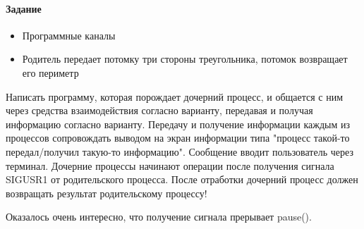 \paragraph{Задание}
\begin{itemize}
    \item Программные каналы
    \item Родитель передает потомку три стороны треугольника, потомок возвращает его периметр
\end{itemize}
Написать программу, которая порождает дочерний процесс, и общается с ним через
средства взаимодействия согласно варианту, передавая и получая информацию согласно
варианту.
Передачу и получение информации каждым из процессов сопровождать выводом на
экран информации типа "процесс такой-то передал/получил такую-то информацию".
Сообщение вводит пользователь через терминал.
Дочерние процессы начинают операции
после получения сигнала SIGUSR1 от родительского процесса.
После отработки дочерний процесс должен возвращать результат родительскому процессу!


%
Оказалось очень интересно, что получение сигнала прерывает pause().